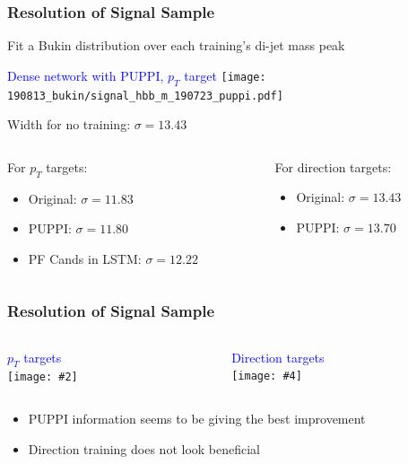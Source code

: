 \documentclass{beamer}
\newcommand{\twofigs}[4]{
  \begin{columns}
    \begin{column}{0.5\linewidth}
      \centering
      \textcolor{blue}{#1} \\
      \texttt{[image: \#2]}
    \end{column}
    \begin{column}{0.5\linewidth}
      \centering
      \textcolor{blue}{#3} \\
      \texttt{[image: \#4]}
    \end{column}
  \end{columns}
}
\begin{document}
\begin{frame}
  \frametitle{Resolution of Signal Sample}

  Fit a Bukin distribution over each training's di-jet mass peak

  \begin{center}
    \textcolor{blue}{Dense network with PUPPI, $p_T$ target}
    \texttt{[image: 190813\_bukin/signal\_hbb\_m\_190723\_puppi.pdf]}
  \end{center}

  Width for no training: $\sigma = 13.43$

  \vspace{12pt}

  \begin{columns}
    \begin{column}{0.5\linewidth}
      For $p_T$ targets:
      \begin{itemize}
      \item Original: $\sigma = 11.83$
      \item PUPPI: $\sigma = 11.80$
      \item PF Cands in LSTM: $\sigma = 12.22$
      \end{itemize}
    \end{column}
    \begin{column}{0.5\linewidth}
      For direction targets:
      \begin{itemize}
      \item Original: $\sigma = 13.43$
      \item PUPPI: $\sigma = 13.70$
        \phantom{\item PF Cands in LSTM: \\ $\sigma = 12.22$}
        \phantom{\item PF Cands in LSTM: \\ $\sigma = 12.22$}
      \end{itemize}
    \end{column}
  \end{columns}

\end{frame}

\begin{frame}
  \frametitle{Resolution of Signal Sample}

  \twofigs{$p_T$ targets}
          {190813_compare/comparison.pdf}
          {Direction targets}
          {190813_compare_direction/comparison.pdf}

  \begin{itemize}
  \item PUPPI information seems to be giving the best improvement
  \item Direction training does not look beneficial
  \end{itemize}

\end{frame}
\end{document}
